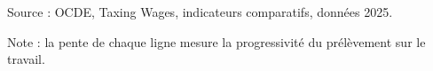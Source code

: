 Source : OCDE, Taxing Wages, indicateurs comparatifs, données 2025.\par Note : la pente de chaque ligne mesure la progressivité du prélèvement sur le travail.
